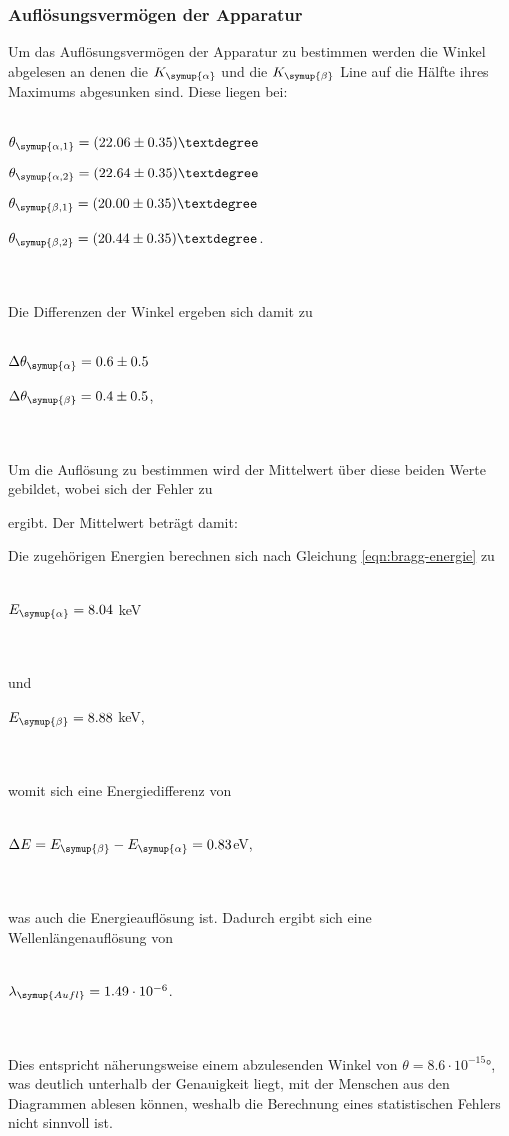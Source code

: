     \subsubsection{Auflösungsvermögen der Apparatur}
        \label{sec:cu} 
        Um das Auflösungsvermögen der Apparatur zu bestimmen werden die Winkel abgelesen an denen die $K_{\symup{\alpha}}$ und die $K_{\symup{\beta}}$
        Line auf die Hälfte ihres Maximums abgesunken sind.
        Diese liegen bei:
        \\ \\
        \centerline{$\theta_{\symup{\alpha,1}} = (22.06 \pm 0.35)°$}
        \centerline{$\theta_{\symup{\alpha,2}} = (22.64 \pm 0.35)°$}
        \centerline{$\theta_{\symup{\beta,1}} = (20.00 \pm 0.35)°$}
        \centerline{$\theta_{\symup{\beta,2}} = (20.44 \pm 0.35)°$.}
        \\ \\
        Die Differenzen der Winkel ergeben sich damit zu
        \\ \\
        \centerline{$\Delta \theta_{\symup{\alpha}} = 0.6 \pm 0.5 $}
        \centerline{$\Delta \theta_{\symup{\beta}} = 0.4 \pm 0.5 $,}
        \\ \\



        Um die Auflösung zu bestimmen wird der Mittelwert über diese beiden Werte gebildet, wobei sich der Fehler zu 



        ergibt. Der Mittelwert beträgt damit:


        
        Die zugehörigen Energien berechnen sich nach Gleichung \eqref{eqn:bragg-energie} zu
        \\ \\
        \centerline{$E_{\symup{\alpha}} = 8.04$ keV}
        \\ \\
        und 
        \centerline{$E_{\symup{\beta}} = 8.88$ keV,}
        \\ \\
        womit sich eine Energiedifferenz von 
        \\ \\
        \centerline{$\Delta E = E_{\symup{\beta}} - E_{\symup{\alpha}} = 0.83$eV,}
        \\ \\
        was auch die Energieauflösung ist.
        Dadurch ergibt sich eine Wellenlängenauflösung von 
        \\ \\
        \centerline{$\lambda_{\symup{Aufl}} = 1.49 \cdot 10^{-6}$.}
        \\ \\
        Dies entspricht näherungsweise einem abzulesenden Winkel von $\theta = 8.6 \cdot 10^{-15} °$, was deutlich unterhalb der Genauigkeit
        liegt, mit der  Menschen 
        aus den Diagrammen ablesen können, weshalb die Berechnung eines statistischen Fehlers nicht sinnvoll ist.

